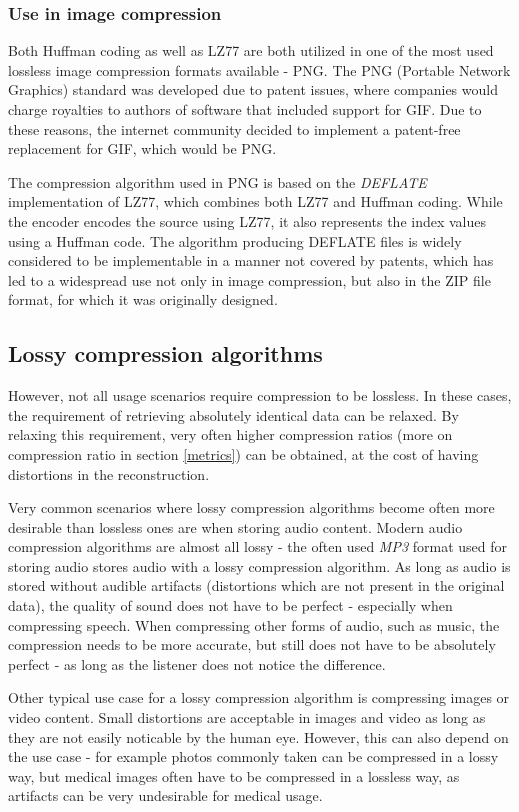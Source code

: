 \documentclass[thesis=M,english]{FITthesis}[2012/10/20]
\begin{document}
\subsubsection{Use in image compression}
Both Huffman coding as well as LZ77 are both utilized in one of the most
used lossless image compression formats available - PNG. The PNG (Portable
Network Graphics) standard was developed due to patent issues, where
companies would charge royalties to authors of software that included
support for GIF. Due to these reasons, the internet community decided to
implement a patent-free replacement for GIF, which would be PNG.\cite{png}

The compression algorithm used in PNG is based on the \emph{DEFLATE}
implementation of LZ77, which combines both LZ77 and Huffman coding. While the encoder
encodes the source using LZ77, it also represents the index values using a Huffman code.
The algorithm producing DEFLATE files is widely considered to be implementable in a manner
not covered by patents, which has led to a widespread use not only in image compression,
but also in the ZIP file format, for which it was originally designed.\cite{deflate}

\subsection{Lossy compression algorithms}
However, not all usage scenarios require compression to be lossless. In
these cases, the requirement of retrieving absolutely identical data can
be relaxed. By relaxing this requirement, very often higher compression
ratios (more on compression ratio in section \ref{metrics}) can be obtained,
at the cost of having distortions in the reconstruction.

Very common scenarios where lossy compression algorithms become often more
desirable than lossless ones are when storing audio content. Modern audio
compression algorithms are almost all lossy - the often used \emph{MP3}
format used for storing audio stores audio with a lossy compression
algorithm. As long as audio is stored without audible artifacts (distortions
which are not present in the original data), the quality of sound does not
have to be perfect - especially when compressing speech. When compressing
other forms of audio, such as music, the compression needs to be more accurate,
but still does not have to be absolutely perfect - as long as the listener
does not notice the difference.

Other typical use case for a lossy compression algorithm is compressing images
or video content. Small distortions are acceptable in images and video as long
as they are not easily noticable by the human eye. However, this can also depend
on the use case - for example photos commonly taken can be compressed in a lossy
way, but medical images often have to be compressed in a lossless way, as artifacts
can be very undesirable for medical usage.
\end{document}
